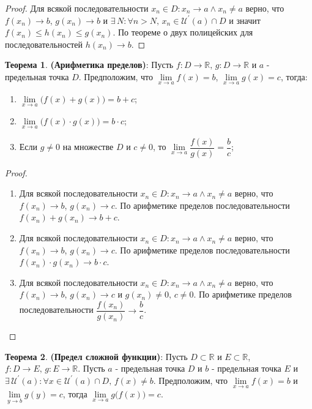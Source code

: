 \documentclass[12pt]{article}
\theoremstyle{definition}
\newtheorem{theorem}{Теорема}
\begin{document}
\begin{proof}
	Для всякой последовательности $x_n \in D \colon x_n \to a \wedge x_n \neq a$ верно, что $f(x_n) \to b$, $g(x_n) \to b$ и $\exists \, N \colon \forall n >N, \, x_n \in \mathcal{U}^\prime(a) \cap D$ и значит $f(x_n) \leq h(x_n) \leq g(x_n)$. По теореме о двух полицейских для последовательностей $h(x_n) \to b$.
\end{proof}

\begin{theorem}\textbf{(Арифметика пределов)}:
	Пусть $f\colon D \to \mathbb{R}, \, g\colon D \to \mathbb{R}$ и $a$ - предельная точка $D$. Предположим, что $\lim\limits_{x \to a}f(x) = b$, $\lim\limits_{x\to a}g(x) = c$, тогда:
	\begin{enumerate}[label={(\arabic*)}]
		\item $\lim\limits_{x \to a} \big(f(x) + g(x)\big) = b + c$;
		\item $\lim\limits_{x \to a} \big(f(x) \cdot g(x)\big) = b \cdot c$;
		\item Если $g \neq 0$ на множестве $D$ и $c \neq 0$, то $\lim\limits_{x \to a} \dfrac{f(x)}{g(x)} = \dfrac{b}{c}$;
	\end{enumerate}
\end{theorem}

\begin{proof}\hfill
	\begin{enumerate}[label={(\arabic*)}]
		\item Для всякой последовательности $x_n \in D \colon x_n \to a \wedge x_n \neq a$ верно, что $f(x_n) \to b$, $g(x_n) \to c$. По арифметике пределов последовательности $f(x_n) + g(x_n) \to b + c$.
		\item Для всякой последовательности $x_n \in D \colon x_n \to a \wedge x_n \neq a$ верно, что $f(x_n) \to b$, $g(x_n) \to c$. По арифметике пределов последовательности $f(x_n) \cdot g(x_n) \to b \cdot c$.
		\item Для всякой последовательности $x_n \in D \colon x_n \to a \wedge x_n \neq a$ верно, что $f(x_n) \to b$, $g(x_n) \to c$ и $g(x_n) \neq 0, \, c \neq 0$. По арифметике пределов последовательности $\dfrac{f(x_n)}{g(x_n)} \to \dfrac{b}{c}$.
	\end{enumerate}
\end{proof}

\begin{theorem} \textbf{(Предел сложной функции)}:
	 Пусть $D \subset \mathbb{R}$ и $E \subset \mathbb{R}$, $f\colon D \to E, \, g\colon E \to \mathbb{R}$. Пусть $a$ - предельная точка $D$ и $b$ - предельная точка $E$ и $\exists \, \mathcal{U}^\prime(a) \colon \forall x \in \mathcal{U}^\prime(a) \cap D, \, f(x) \neq b$. Предположим, что $\lim\limits_{x \to a} f(x) = b$ и $\lim\limits_{y \to b} g(y) = c$, тогда $\lim\limits_{x \to a} g\big(f(x) \big) = c$.
\end{theorem}
\end{document}
